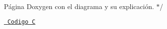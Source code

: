
\begin{DoxyItemize}
\item 
\item Página Doxygen con el diagrama y su explicación. $\ast$/
\end{DoxyItemize}

\href{file:///home/franky/Proyects/Trabajos-Universidad-Codigo-UDG/2semPE/c/src/Condicionales/Selectiva-Doble-anidada-calif.c}{\texttt{ Codigo C}} 